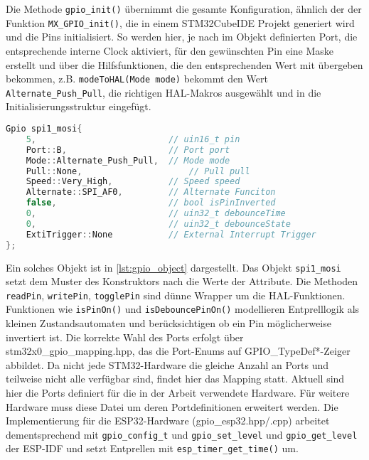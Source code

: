 Die Methode \texttt{gpio\_init()} übernimmt die gesamte Konfiguration, ähnlich der der Funktion \texttt{MX\_GPIO\_init()}, die in einem STM32CubeIDE Projekt generiert wird und die Pins initialisiert.
So werden hier, je nach im Objekt definierten Port, die entsprechende interne Clock aktiviert, für den gewünschten Pin eine Maske erstellt und über die Hilfsfunktionen, die den entsprechenden Wert mit übergeben bekommen, z.B. \texttt{modeToHAL(Mode mode)} bekommt den Wert \texttt{Alternate\_Push\_Pull}, die richtigen HAL-Makros ausgewählt und in die Initialisierungsstruktur eingefügt. 

\begin{lstlisting}[language=C++, caption={Beispiel eines Gpio Objektes.}, label={lst:gpio_object}]
Gpio spi1_mosi{
	5,							// uin16_t pin
	Port::B, 					// Port port
	Mode::Alternate_Push_Pull,	// Mode mode
	Pull::None, 					// Pull pull
	Speed::Very_High, 			// Speed speed
	Alternate::SPI_AF0, 		// Alternate Funciton
	false, 						// bool isPinInverted
	0, 							// uin32_t debounceTime
	0, 							// uin32_t debounceState
	ExtiTrigger::None			// External Interrupt Trigger
};
\end{lstlisting}

Ein solches Objekt ist in \cref{lst:gpio_object} dargestellt.
Das Objekt \texttt{spi1\_mosi} setzt dem Muster des Konstruktors nach die Werte der Attribute.
Die Methoden \texttt{readPin}, \texttt{writePin}, \texttt{togglePin} sind dünne Wrapper um die HAL-Funktionen.
Funktionen wie \texttt{isPinOn()} und \texttt{isDebouncePinOn()} modellieren Entprelllogik als kleinen Zustandsautomaten und berücksichtigen ob ein Pin möglicherweise invertiert ist.
Die korrekte Wahl des Ports erfolgt über stm32x0\_gpio\_mapping.hpp, das die Port-Enums auf GPIO\_TypeDef*-Zeiger abbildet.
Da nicht jede STM32-Hardware die gleiche Anzahl an Ports und teilweise nicht alle verfügbar sind, findet hier das Mapping statt.
Aktuell sind hier die Ports definiert für die in der Arbeit verwendete Hardware.
Für weitere Hardware muss diese Datei um deren Portdefinitionen erweitert werden.
Die Implementierung für die ESP32-Hardware (gpio\_esp32.hpp/.cpp) arbeitet dementsprechend mit \texttt{gpio\_config\_t} und \texttt{gpio\_set\_level} und \texttt{gpio\_get\_level} der ESP-IDF und setzt Entprellen mit \texttt{esp\_timer\_get\_time()} um.

